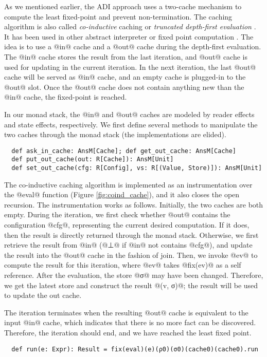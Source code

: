As we mentioned earlier, the ADI approach uses a two-cache mechanism to
compute the least fixed-point and prevent non-termination.
The caching algorithm is also called \textit{co-inductive} caching or
\textit{truncated depth-first evaluation} \cite{Rosendahl:AbsIntPL}. It has
been used in other abstract interpreter or fixed point computation
\cite{DBLP:journals/pacmpl/DaraisLNH17, Wei:2018:RAA:3243631.3236800,
  Rosendahl:AbsIntPL}. The idea is to use a @in@ cache and a @out@ cache during
the depth-first evaluation. The @in@ cache stores the result from the last
iteration, and @out@ cache is used for updating in the current iteration. In the next
iteration, the last @out@ cache will be served as @in@ cache, and an empty cache
is plugged-in to the @out@ slot. Once the @out@ cache does not contain anything
new than the @in@ cache, the fixed-point is reached.

In our monad stack, the @in@ and @out@ caches are modeled by reader effects and
state effects, respectively. We first define several methods to manipulate
the two caches through the monad stack (the implementations are elided).
\begin{lstlisting}
  def ask_in_cache: AnsM[Cache]; def get_out_cache: AnsM[Cache]
  def put_out_cache(out: R[Cache]): AnsM[Unit]
  def set_out_cache(cfg: R[Config], vs: R[(Value, Store)]): AnsM[Unit]
\end{lstlisting}

The co-inductive caching algorithm is implemented as an instrumentation over the
@eval@ function (Figure \ref{fig:coind_cache}), and it also closes the open recursion.
The instrumentation works as follows. Initially, the two caches are both empty.
During the iteration, we first check whether @out@ contains the configuration
@cfg@, representing the current desired computation. If it does, then the result
is directly returned through the monad stack.
Otherwise, we first retrieve the result from @in@ (@⊥@ if @in@ not contains
@cfg@), and update the result into the @out@ cache in the fashion of join.
Then, we invoke @ev@ to compute the result for this iteration, where @ev@ takes
@fix(ev)@ as a self reference.
After the evaluation, the store @σ@ may have been changed. Therefore, 
we get the latest store and construct the result @(v, σ)@; the
result will be used to update the out cache.

The iteration terminates when the resulting @out@ cache is equivalent to the
input @in@ cache, which indicates that there is no more fact can be discovered.
Therefore, the iteration should end, and we have reached the least fixed point.
\begin{lstlisting}
  def run(e: Expr): Result = fix(eval)(e)(ρ0)(σ0)(cache0)(cache0).run
\end{lstlisting}

